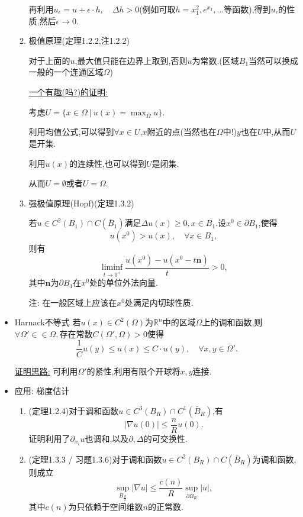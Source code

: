 \documentclass[12pt, a4paper]{ctexart}
\begin{document}
\begin{itemize}
\begin{enumerate}
        再利用$u_\epsilon=u+\epsilon\cdot h,\quad \Delta h>0$(例如可取$h=x_1^2, e^{x_1},...$等函数),得到$u_\epsilon$的性质,然后$\epsilon\rightarrow0$.
        
        \item 极值原理(定理1.2.2,注1.2.2)
        
        对于上面的$u$,最大值只能在边界上取到,否则$u$为常数.(区域$B_1$当然可以换成一般的一个连通区域$\Omega$)
        
        \uline{一个有趣(吗?)的证明:}
        
        考虑$U=\{x\in\Omega\ |\ u(x)=\mathop{\max}_{\bar{\Omega}}u\}$.
        
        利用均值公式,可以得到$\forall x\in U$,$x$附近的点(当然也在$\Omega $中!)$y$也在$U$中,从而$U$是开集.
        
        利用$u(x)$的连续性,也可以得到$U$是闭集.
        
        从而$U=\emptyset$或者$U=\Omega$.
        
        \item 强极值原理(Hopf)(定理1.3.2)
        
        若$u\in C^2(B_1)\cap C(\bar{B}_1)$满足$\Delta u(x) \geq 0, x\in B_1$.设$x^0\in\partial B_1$,使得
        $$u(x^0)>u(x), \quad \forall x\in B_1,$$则有
        $$\mathop{\lim\inf}_{t\rightarrow 0^+}\frac{u(x^0) - u(x^0-t\bm n)}t > 0,$$
        其中$\bm n$为$\partial B_1$在$x^0$处的单位外法向量.
        
        注: 在一般区域上应该在$x^0$处满足内切球性质.
        \end{enumerate}
        \item Harnack不等式
        若$u(x)\in C^2(\Omega)$为$\mathbb{R}^n$中的区域$\Omega$上的调和函数,则$\forall \Omega' \in\in \Omega,$存在常数$C(\Omega', \Omega) > 0$使得
        $$\frac1{C}u(y) \leq u(x) \leq C\cdot u(y),\quad \forall x,y\in\bar{\Omega}'.$$
        
        \uline{证明思路:} 可利用$\Omega'$的紧性,利用有限个开球将$x,y$连接.
        
        \item 应用: 梯度估计
        \begin{enumerate}
            \item (定理1.2.4)对于调和函数$u\in C^3(B_R)\cap C^1(\bar{B}_R)$,有
            $$|\nabla u(0)| \leq \frac nR u(0).$$
            证明利用了$\partial_{x_i}u$也调和,以及$\partial, \Delta$的可交换性.
            
            \item (定理1.3.3 / 习题1.3.6)对于调和函数$u \in C^2(B_R) \cap C(\bar{B}_R)$为调和函数,则成立$$
            \sup_{B_{\frac{R}{2}}} |\nabla u| \le \frac{c(n)}{R} \sup_{\partial B_R}|u|,	$$
            其中$c(n)$为只依赖于空间维数$n$的正常数.
            

\end{enumerate}
\end{itemize}
\end{document}
